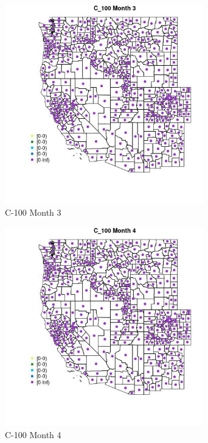 \begin{figure} 
\centering  
\includegraphics[width=0.77\textwidth]{Code_Outputs/df_report_ML_predictors_CountyCentroid_Locations_Dates_2008-01-01to2018-12-31_MapObsMo3C_100.jpg} 
\caption{\label{fig:df_report_ML_predictors_CountyCentroid_Locations_Dates_2008-01-01to2018-12-31MapObsMo3C_100}C-100 Month 3} 
\end{figure} 
 

\begin{figure} 
\centering  
\includegraphics[width=0.77\textwidth]{Code_Outputs/df_report_ML_predictors_CountyCentroid_Locations_Dates_2008-01-01to2018-12-31_MapObsMo4C_100.jpg} 
\caption{\label{fig:df_report_ML_predictors_CountyCentroid_Locations_Dates_2008-01-01to2018-12-31MapObsMo4C_100}C-100 Month 4} 
\end{figure} 
 

